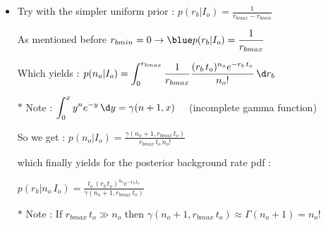 \Tr
\begin{itemize}
\item Try with the simpler uniform prior : $\displaystyle p(r_{b}|I_{o})=\frac{1}{r_{bmax}-r_{bmin}}$
\item[] As mentioned before $\displaystyle r_{bmin}=0 \rightarrow {\blue p(r_{b}|I_{o})=\frac{1}{r_{bmax}}}$\\
\item[] Which yields :  {\blue $\displaystyle p(n_{o}|I_{o})=\int_{0}^{r_{bmax}}
                         \frac{1}{r_{bmax}}
                         \frac{(r_{b}\,t_{o})^{n_{o}} e^{-r_{b}\,t_{o}}}{n_{o}!}\,\d r_{b}$}
\item[$\ast$] Note : $\displaystyle \int_{0}^{x} y^{n} e^{-y}\,\d y=\gamma(n+1,x) \quad$ (incomplete gamma function)\\
\item[] So we get : {\blue $\displaystyle p(n_{o}|I_{o})=\frac{\gamma(n_{o}+1,r_{bmax}\,t_{o})}{r_{bmax}\,t_{o}\,n_{o}!}$}
\item[] which finally yields for the posterior background rate pdf :
\item[] \begin{center}
        {\blue $\displaystyle p(r_{b}|n_{o}\,I_{o})=
                \frac{t_{o}\,(r_{b}\,t_{o})^{n_{o}} e^{-r_{b}\,t_{o}}}{\gamma(n_{o}+1,r_{bmax}\,t_{o})}$}
        \end{center}
\item[$\ast$] Note : If $r_{bmax}\,t_{o} \gg n_{o}$ then $\gamma(n_{o}+1,r_{bmax}\,t_{o}) \approx \Gamma(n_{o}+1)=n_{o}!$
\end{itemize}

